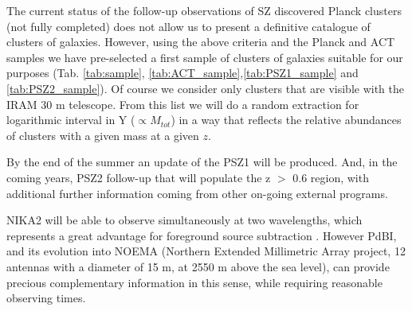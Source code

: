 \documentclass[11pt,a4paper,twoside,graphicx,color]{article}
\begin{document}
\vspace{0.3cm}  
The current status of the follow-up observations of SZ discovered Planck clusters (not fully completed) does not allow us to present a definitive catalogue of clusters of galaxies. However, using the above criteria and the Planck and ACT samples we have pre-selected a first sample of clusters of galaxies suitable for our purposes (Tab. \ref{tab:sample}, \ref{tab:ACT_sample},\ref{tab:PSZ1_sample} and \ref{tab:PSZ2_sample}). Of course we consider only clusters that are visible with the IRAM 30 m telescope. From this list we will do a random extraction for logarithmic interval in Y ($\propto M_{tot}$) in a way that reflects the relative abundances of clusters with a given mass at a given $z$.

By the end of the summer an update of the PSZ1 will be produced. And, in the coming years, PSZ2 follow-up that will populate the z $>$ 0.6 region, with additional further information coming from other on-going external programs.

\vspace{0.3cm}  
NIKA2 will be able to observe simultaneously at two wavelengths, which represents a great advantage for foreground source subtraction \citep[][Adam \& NIKA collaboration in prep.]{Adam2015}. However PdBI, and its evolution into NOEMA (Northern Extended Millimetric Array project, 12 antennas with a diameter of 15 m, at 2550 m above the sea level), can provide precious complementary information in this sense, while requiring reasonable observing times.
\end{document}
